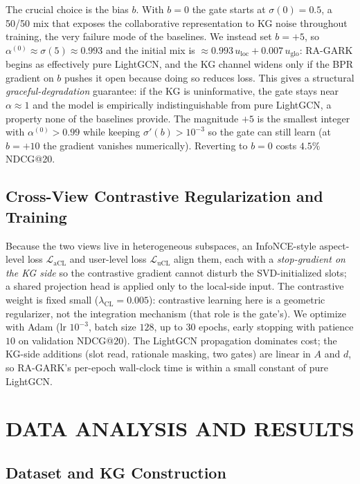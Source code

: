 \documentclass[12pt,a4paper]{article}
\begin{document}
The crucial choice is the bias $b$. With $b=0$ the gate starts at $\sigma(0)=0.5$, a 50/50 mix that exposes the collaborative representation to KG noise throughout training, the very failure mode of the baselines. We instead set $b=+5$, so $\alpha^{(0)}\approx\sigma(5)\approx0.993$ and the initial mix is $\approx 0.993\,u_{\mathrm{loc}}+0.007\,u_{\mathrm{glo}}$: RA-GARK begins as effectively pure LightGCN, and the KG channel widens only if the BPR gradient on $b$ pushes it open because doing so reduces loss. This gives a structural \emph{graceful-degradation} guarantee: if the KG is uninformative, the gate stays near $\alpha\approx1$ and the model is empirically indistinguishable from pure LightGCN, a property none of the baselines provide. The magnitude $+5$ is the smallest integer with $\alpha^{(0)}>0.99$ while keeping $\sigma'(b)>10^{-3}$ so the gate can still learn (at $b=+10$ the gradient vanishes numerically). Reverting to $b=0$ costs $4.5\%$ NDCG@20.

\subsection{Cross-View Contrastive Regularization and Training}

Because the two views live in heterogeneous subspaces, an InfoNCE-style aspect-level loss $\mathcal{L}_{\mathrm{aCL}}$ and user-level loss $\mathcal{L}_{\mathrm{uCL}}$ align them, each with a \emph{stop-gradient on the KG side} so the contrastive gradient cannot disturb the SVD-initialized slots; a shared projection head is applied only to the local-side input. The contrastive weight is fixed small ($\lambda_{\mathrm{CL}}=0.005$): contrastive learning here is a geometric regularizer, not the integration mechanism (that role is the gate's). We optimize with Adam (lr $10^{-3}$, batch size $128$, up to $30$ epochs, early stopping with patience $10$ on validation NDCG@20). The LightGCN propagation dominates cost; the KG-side additions (slot read, rationale masking, two gates) are linear in $A$ and $d$, so RA-GARK's per-epoch wall-clock time is within a small constant of pure LightGCN.

\section{DATA ANALYSIS AND RESULTS}
\label{sec:exp}

\subsection{Dataset and KG Construction}
\end{document}
